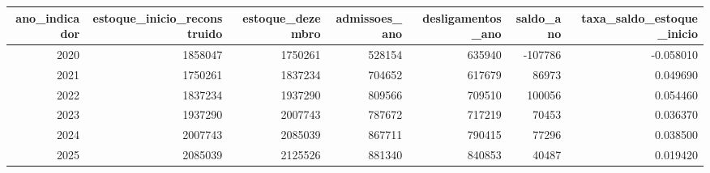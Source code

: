 \begin{tabular}{rrrrrrr}
\toprule
ano_indicador & estoque_inicio_reconstruido & estoque_dezembro & admissoes_ano & desligamentos_ano & saldo_ano & taxa_saldo_estoque_inicio \\
\midrule
2020 & 1858047 & 1750261 & 528154 & 635940 & -107786 & -0.058010 \\
2021 & 1750261 & 1837234 & 704652 & 617679 & 86973 & 0.049690 \\
2022 & 1837234 & 1937290 & 809566 & 709510 & 100056 & 0.054460 \\
2023 & 1937290 & 2007743 & 787672 & 717219 & 70453 & 0.036370 \\
2024 & 2007743 & 2085039 & 867711 & 790415 & 77296 & 0.038500 \\
2025 & 2085039 & 2125526 & 881340 & 840853 & 40487 & 0.019420 \\
\bottomrule
\end{tabular}
